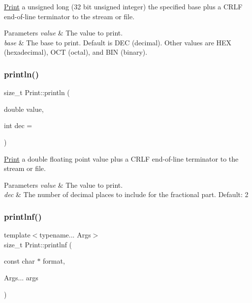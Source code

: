 \mbox{\hyperlink{class_print}{Print}} a unsigned long (32 bit unsigned integer) the specified base plus a C\+R\+LF end-\/of-\/line terminator to the stream or file. 


\begin{DoxyParams}{Parameters}
{\em value} & The value to print. \\
\hline
{\em base} & The base to print. Default is D\+EC (decimal). Other values are H\+EX (hexadecimal), O\+CT (octal), and B\+IN (binary). \\
\hline
\end{DoxyParams}
\mbox{\label{class_print_a178b90baf9f74f0945f5c64aafec59ea}} 
\subsubsection{\texorpdfstring{println()}{println()}\hspace{0.1cm}{\footnotesize\ttfamily [6/6]}}
{\footnotesize\ttfamily size\+\_\+t Print\+::println (\begin{DoxyParamCaption}\item[{double}]{value,  }\item[{int}]{dec = {} }\end{DoxyParamCaption})}



\mbox{\hyperlink{class_print}{Print}} a double floating point value plus a C\+R\+LF end-\/of-\/line terminator to the stream or file. 


\begin{DoxyParams}{Parameters}
{\em value} & The value to print. \\
\hline
{\em dec} & The number of decimal places to include for the fractional part. Default\+: 2 \\
\hline
\end{DoxyParams}
\mbox{\label{class_print_afa41aa5211c54b7b4d79b9286880c337}} 
\subsubsection{\texorpdfstring{printlnf()}{printlnf()}}
{\footnotesize\ttfamily template$<$typename... Args$>$ \\
size\+\_\+t Print\+::printlnf (\begin{DoxyParamCaption}\item[{const char $\ast$}]{format,  }\item[{Args...}]{args }\end{DoxyParamCaption})\hspace{0.3cm}{\ttfamily [inline]}}



